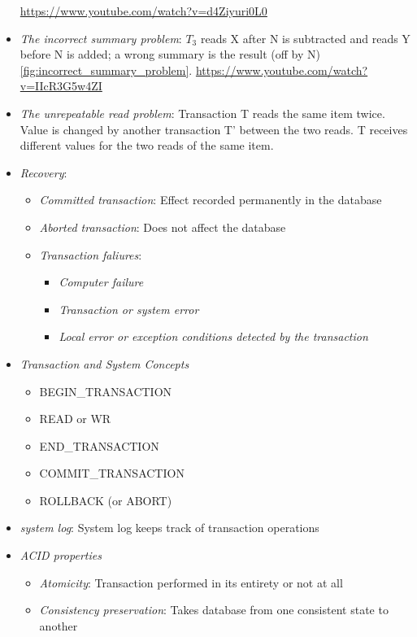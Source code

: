 \documentclass{article}
\begin{document}
\begin{itemize}
    \url{https://www.youtube.com/watch?v=d4Ziyuri0L0}
    \item \textit{The incorrect summary problem}: $T_3$ reads X after N is subtracted and reads Y before N is added; a wrong summary is the result (off by N) \ref{fig:incorrect_summary_problem}.
    \url{https://www.youtube.com/watch?v=IIcR3G5w4ZI}
    \item \textit{The unrepeatable read problem}: Transaction T reads the same item twice. Value is changed by another transaction T' between the two reads. T receives different values for the two reads of the same item.
    \item \textit{Recovery}: 
    \begin{itemize}
        \item \textit{Committed transaction}: Effect recorded permanently in the database
        \item \textit{Aborted transaction}: Does not affect the database
        \item \textit{Transaction faliures}:
        \begin{itemize}
            \item \textit{Computer failure}
            \item \textit{Transaction or system error}
            \item \textit{Local error or exception conditions detected by the transaction}
        \end{itemize}
    \end{itemize}
    \item \textit{Transaction and System Concepts}
    \begin{itemize}
        \item BEGIN\_TRANSACTION
        \item READ or WR
        \item END\_TRANSACTION
        \item COMMIT\_TRANSACTION
        \item ROLLBACK (or ABORT)
    \end{itemize}
    \item \textit{system log}: System log keeps track of transaction operations
    \item \textit{ACID properties}
    \begin{itemize}
        \item \textit{Atomicity}: Transaction performed in its entirety or not at all
        \item \textit{Consistency preservation}: Takes database from one consistent state to another

\end{itemize}
\end{itemize}
\end{document}
